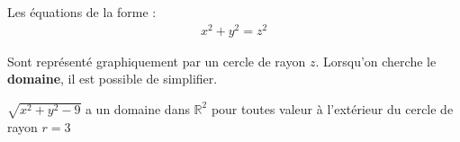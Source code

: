 \documentclass{report}
\begin{document}
\begin{multicols*}{3}
     Les équations de la forme : 
     \begin{align*}
            x^2 + y^2 = z^2
     \end{align*}

     Sont représenté graphiquement par un cercle de rayon $z$.  
     Lorsqu'on cherche le \textbf{domaine}, il est possible de  
     simplifier.


     \begin{EExample}{}{}
         $\sqrt{x^2 + y^2 - 9}$ a un domaine dans $\mathbb{R}^2$ pour 
         toutes valeur à l'extérieur du cercle de rayon $r = 3$ 
     \end{EExample}


        







  \end{multicols*}
\end{document}
